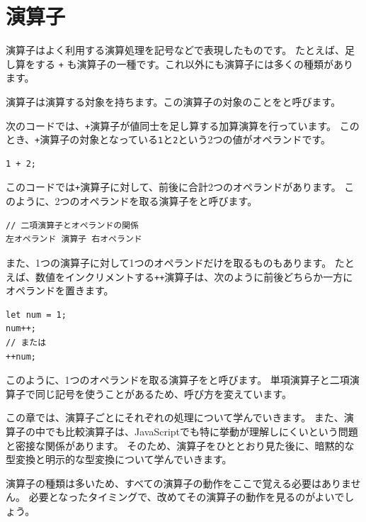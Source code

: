 \hypertarget{operator}{%
\chapter{演算子}\label{operator}}
\thispagestyle{frontheadings}

演算子はよく利用する演算処理を記号などで表現したものです。
たとえば、足し算をする \texttt{+}
も演算子の一種です。これ以外にも演算子には多くの種類があります。

演算子は演算する対象を持ちます。この演算子の対象のことを\textbf{}と呼びます。

次のコードでは、\texttt{+}演算子が値同士を足し算する加算演算を行っています。
このとき、\texttt{+}演算子の対象となっている\texttt{1}と\texttt{2}という2つの値がオペランドです。

\begin{lstlisting}
1 + 2;
\end{lstlisting}

このコードでは\texttt{+}演算子に対して、前後に合計2つのオペランドがあります。
このように、2つのオペランドを取る演算子を\textbf{}と呼びます。

\begin{lstlisting}
// 二項演算子とオペランドの関係
左オペランド 演算子 右オペランド
\end{lstlisting}

また、1つの演算子に対して1つのオペランドだけを取るものもあります。
たとえば、数値をインクリメントする\texttt{++}演算子は、次のように前後どちらか一方にオペランドを置きます。

\begin{lstlisting}
let num = 1;
num++;
// または
++num;
\end{lstlisting}

このように、1つのオペランドを取る演算子を\textbf{}と呼びます。
単項演算子と二項演算子で同じ記号を使うことがあるため、呼び方を変えています。

この章では、演算子ごとにそれぞれの処理について学んでいきます。
また、演算子の中でも比較演算子は、JavaScriptでも特に挙動が理解しにくい\textbf{}という問題と密接な関係があります。
そのため、演算子をひととおり見た後に、暗黙的な型変換と明示的な型変換について学んでいきます。

演算子の種類は多いため、すべての演算子の動作をここで覚える必要はありません。
必要となったタイミングで、改めてその演算子の動作を見るのがよいでしょう。

